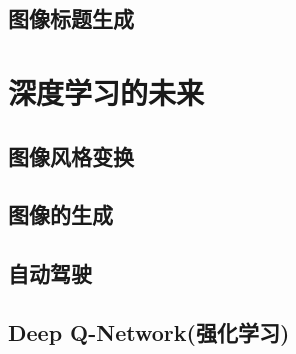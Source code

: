 \subsection{图像标题生成}
\section{深度学习的未来}
\subsection{图像风格变换}
\subsection{图像的生成}
\subsection{自动驾驶}
\subsection{Deep Q-Network(强化学习)}